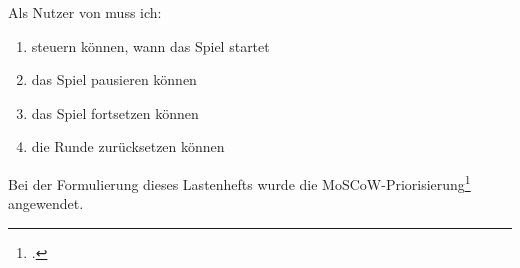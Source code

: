 
Als Nutzer von  muss ich:

\begin{enumerate}
  \item steuern können, wann das Spiel startet
  \item das Spiel pausieren können
  \item das Spiel fortsetzen können
  \item die Runde zurücksetzen können
\end{enumerate}

Bei der Formulierung dieses Lastenhefts wurde die \acs{MoSCoW}-Priorisierung\footcite{MoSCoW} angewendet.
